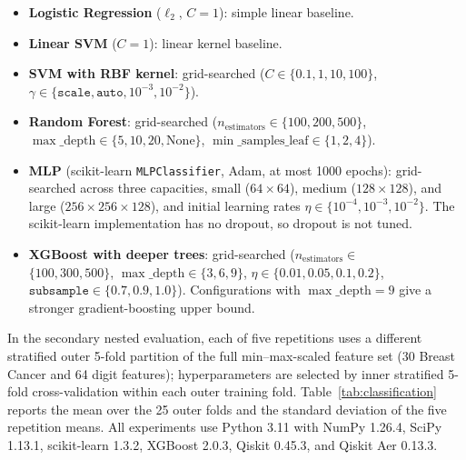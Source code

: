 \documentclass[final,5p,times,number]{elsarticle}
\begin{document}
\begin{itemize}[leftmargin=*]
  \item \textbf{Logistic Regression} ($\ell_2$, $C=1$): simple linear baseline.
  \item \textbf{Linear SVM} ($C=1$): linear kernel baseline.
  \item \textbf{SVM with RBF kernel}: grid-searched ($C \in \{0.1, 1, 10, 100\}$, $\gamma \in \{\texttt{scale}, \texttt{auto}, 10^{-3}, 10^{-2}\}$).
  \item \textbf{Random Forest}: grid-searched ($n_{\text{estimators}} \in \{100, 200, 500\}$, $\max\_\text{depth} \in \{5, 10, 20, \text{None}\}$, $\min\_\text{samples\_leaf} \in \{1, 2, 4\}$).
  \item \textbf{MLP} (scikit-learn \texttt{MLPClassifier}, Adam, at most 1000 epochs): grid-searched across three capacities, small ($64\times64$), medium ($128\times128$), and large ($256\times256\times128$), and initial learning rates $\eta \in \{10^{-4}, 10^{-3}, 10^{-2}\}$. The scikit-learn implementation has no dropout, so dropout is not tuned.
  \item \textbf{XGBoost with deeper trees}: grid-searched ($n_{\text{estimators}} \in$ \\ $\{100, 300, 500\}$, $\max\_\text{depth} \in \{3, 6, 9\}$, $\eta \in \{0.01, 0.05, 0.1, 0.2\}$, $\texttt{subsample} \in \{0.7, 0.9, 1.0\}$). Configurations with $\max\_\text{depth}=9$ give a stronger gradient-boosting upper bound.
\end{itemize}

In the secondary nested evaluation, each of five repetitions uses a different stratified outer 5-fold partition of the full min--max-scaled feature set (30 Breast Cancer and 64 digit features); hyperparameters are selected by inner stratified 5-fold cross-validation within each outer training fold. Table~\ref{tab:classification} reports the mean over the 25 outer folds and the standard deviation of the five repetition means. All experiments use Python 3.11 with NumPy 1.26.4, SciPy 1.13.1, scikit-learn 1.3.2, XGBoost 2.0.3, Qiskit 0.45.3, and Qiskit Aer 0.13.3.
\end{document}
